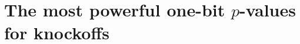 \documentclass[12pt]{article}
\theoremstyle{definition}
\theoremstyle{remark}
\newcommand{\srz}{Z}
\newcommand{\sry}{Y}
\begin{document}
%
%
%


\section{The most powerful one-bit $p$-values for knockoffs}
\label{sec:knockoffs}
\end{document}

